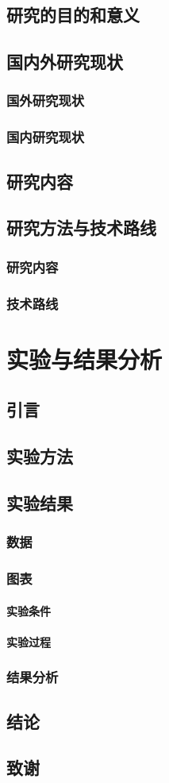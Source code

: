 \documentclass{ctexbook}
\begin{document}
    \section{研究的目的和意义}
    \section{国内外研究现状}
    \subsection{国外研究现状}
    \subsection{国内研究现状}
    \section{研究内容}
    \section{研究方法与技术路线}
    \subsection{研究内容}
    \subsection{技术路线}

    \chapter{实验与结果分析}
    \section{引言}
    \section{实验方法}
    \section{实验结果}
    \subsection{数据}
    \subsection{图表}
    \subsubsection{实验条件}
    \subsubsection{实验过程}
    \subsection{结果分析}
    \section{结论}
    \section{致谢}
\end{document}
